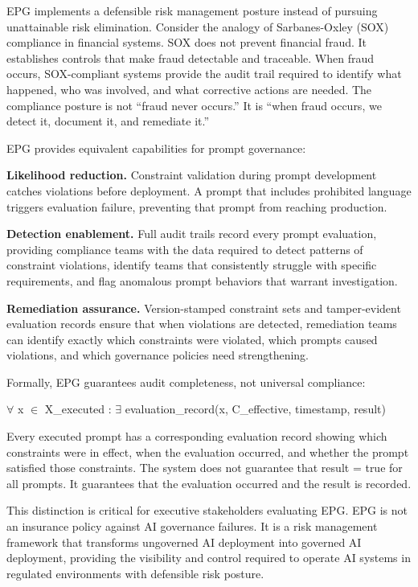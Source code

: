 EPG implements a defensible risk management posture instead of pursuing unattainable risk elimination. Consider the analogy of Sarbanes-Oxley (SOX) compliance in financial systems. SOX does not prevent financial fraud. It establishes controls that make fraud detectable and traceable. When fraud occurs, SOX-compliant systems provide the audit trail required to identify what happened, who was involved, and what corrective actions are needed. The compliance posture is not ``fraud never occurs.'' It is ``when fraud occurs, we detect it, document it, and remediate it.''

EPG provides equivalent capabilities for prompt governance:

\textbf{Likelihood reduction.} Constraint validation during prompt development catches violations before deployment. A prompt that includes prohibited language triggers evaluation failure, preventing that prompt from reaching production.

\textbf{Detection enablement.} Full audit trails record every prompt evaluation, providing compliance teams with the data required to detect patterns of constraint violations, identify teams that consistently struggle with specific requirements, and flag anomalous prompt behaviors that warrant investigation.

\textbf{Remediation assurance.} Version-stamped constraint sets and tamper-evident evaluation records ensure that when violations are detected, remediation teams can identify exactly which constraints were violated, which prompts caused violations, and which governance policies need strengthening.

Formally, EPG guarantees audit completeness, not universal compliance:

\begin{claddisp}
$\forall$ x $\in$ X\_executed : $\exists$ evaluation\_record(x, C\_effective, timestamp, result)
\end{claddisp}


Every executed prompt has a corresponding evaluation record showing which constraints were in effect, when the evaluation occurred, and whether the prompt satisfied those constraints. The system does not guarantee that result = true for all prompts. It guarantees that the evaluation occurred and the result is recorded.

This distinction is critical for executive stakeholders evaluating EPG. EPG is not an insurance policy against AI governance failures. It is a risk management framework that transforms ungoverned AI deployment into governed AI deployment, providing the visibility and control required to operate AI systems in regulated environments with defensible risk posture.

